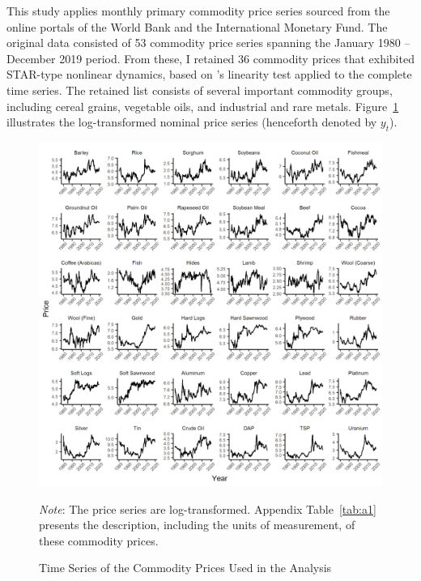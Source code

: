 \documentclass[11pt]{article}
\begin{document}
This study applies monthly primary commodity price series sourced from the online portals of the World Bank and the International Monetary Fund. The original data consisted of 53 commodity price series spanning the January 1980 -- December 2019 period. From these, I retained 36 commodity prices that exhibited STAR-type nonlinear dynamics, based on \cite{terasvirta1994}'s linearity test applied to the complete time series. The retained list consists of several important commodity groups, including cereal grains, vegetable oils, and industrial and rare metals. Figure~\ref{prices} illustrates the log-transformed nominal price series (henceforth denoted by $y_t$).
\begin{figure}
	\includegraphics[scale=1]{../Prices}
	\caption{Time Series of the Commodity Prices Used in the Analysis}
	\label{prices}
	\textit{Note}: The price series are log-transformed. Appendix Table~\ref{tab:a1} presents the description, including the units of measurement, of these commodity prices. 
\end{figure}
\end{document}
